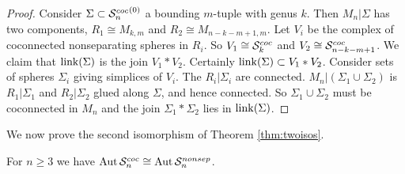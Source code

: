 \begin{proof}
Consider $\Sigma \subset {{\ensuremath{ \mathcal S^{{coc}}_{n} }}}^{(0)}$ a bounding $m$-tuple with genus $k$.
Then $M_n|\Sigma$ has two components, $R_1 \cong M_{k,m}$ and $R_2 \cong M_{n-k-m+1,m}$.
Let $V_i$ be the complex of coconnected nonseparating spheres in $R_i$.
So $V_1 \cong {{\ensuremath{ \mathcal S^{{coc}}_{k} }}}$ and $V_2 \cong {\ensuremath{ \mathcal S^{{coc}}_{n-k-m+1} }}$.
We claim that $\operatorname{link}(\Sigma)$ is the join $V_1 \ast V_2$.
Certainly $\operatorname{link}(\Sigma) \subset V_1 \ast V_2$.
Consider sets of spheres $\Sigma_i$ giving simplices of $V_i$.
The $R_i|\Sigma_i$ are connected. $M_n|(\Sigma_1 \cup \Sigma_2)$ is $R_1|\Sigma_1$ and $R_2|\Sigma_2$ glued along $\Sigma$, and hence connected. So $\Sigma_1\cup \Sigma_2$ must be coconnected in $M_n$ and the join $\Sigma_1 \ast \Sigma_2$ lies in $\operatorname{link}(\Sigma)$.
\end{proof}

We now prove the second isomorphism of Theorem \ref{thm:twoisos}.\\

\begin{lemma}
  For $n\geq 3$ we have $\operatorname{Aut}{{ \mathcal S^{{coc}}_{n} }} \cong \operatorname{Aut}{{ \mathcal S^{{nonsep}}_n }}$.
\end{lemma}

